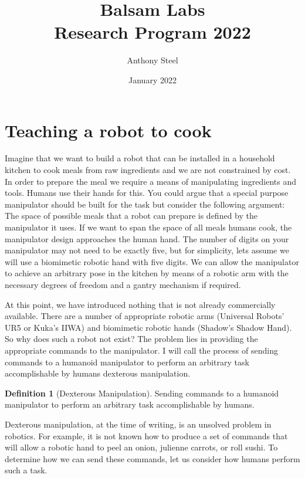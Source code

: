 \documentclass[12pt, letterpaper, twoside]{article}
\title{Balsam Labs\\ Research Program 2022}
\author{Anthony Steel}
\date{January 2022}
\theoremstyle{definition}
\newtheorem{definition}{Definition}[section]
\begin{document}
\begin{titlepage}
\maketitle
\end{titlepage}
\section{Teaching a robot to cook}
Imagine that we want to build a robot that can be installed
in a household kitchen to cook meals from raw ingredients and
we are not constrained by cost. In order to prepare the meal
we require a means of manipulating ingredients and tools. Humans
use their hands for this. You could argue that a special
purpose manipulator should be built for the task but consider the following
argument: The space of possible meals that a robot can prepare
is defined by the manipulator it uses. If we want to span the space
of all meals humans cook, the manipulator design approaches the human hand.
The number of digits on your manipulator may not need to be exactly five, but
for simplicity, lets assume we will use a biomimetic robotic hand with
five digits. We can allow the manipulator to achieve an arbitrary pose
in the kitchen by means of a robotic arm with the necessary degrees of freedom
and a gantry mechanism if required.

At this point, we have introduced nothing that is not already commercially
available. There are a number of appropriate robotic arms (Universal Robots'
UR5 or Kuka's IIWA) and biomimetic robotic hands (Shadow's Shadow Hand).
So why does such a robot not exist? The problem lies in providing the
appropriate commands to the manipulator. I will call the process of sending commands
to a humanoid manipulator to perform an arbitrary task accomplishable by
humans dexterous manipulation.
\begin{definition}[Dexterous Manipulation]
  Sending commands to a humanoid manipulator to perform an arbitrary task
  accomplishable by humans.
\end{definition}
Dexterous manipulation, at the time of writing, is an unsolved
problem in robotics. For example, it is not known how to produce a set of
commands that will allow a robotic hand to peel an onion, julienne carrots, or
roll sushi. To determine how we can send these commands, let us consider
how humans perform such a task.
\end{document}
